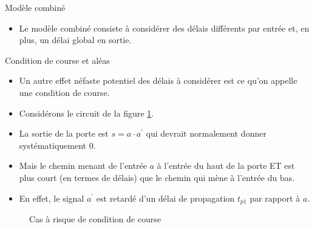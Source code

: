 \documentclass[presentation]{beamer}
\begin{document}
\begin{frame}[label={sec:org631259d}]{Modèle combiné}
\begin{itemize}
\item Le modèle combiné consiste à considérer des délais différents par entrée et, en plus, un délai global en sortie.
\end{itemize}
\end{frame}

\begin{frame}[label={sec:orgbdc0db0}]{Condition de course et aléas}
\begin{itemize}
\item Un autre effet néfaste potentiel des délais à considérer est ce qu'on appelle une \alert{condition de course}.

\item Considérons le circuit de la figure \ref{fig:org29df200}.

\item La sortie de la porte est \(s = a \cdot a^\prime\) qui devrait normalement donner systématiquement 0.

\item Mais le chemin menant de l'entrée \(a\) à l'entrée du haut de la porte ET est plus court (en termes de délais) que le chemin qui mène à l'entrée du bas.

\item En effet, le signal \(a^\prime\) est retardé d'un délai de propagation \(t_{p1}\) par rapport à \(a\).
\end{itemize}

\begin{figure}[htbp]
\centering

\caption{\label{fig:org29df200}Cas à risque de condition de course}
\end{figure}
\end{frame}
\end{document}
